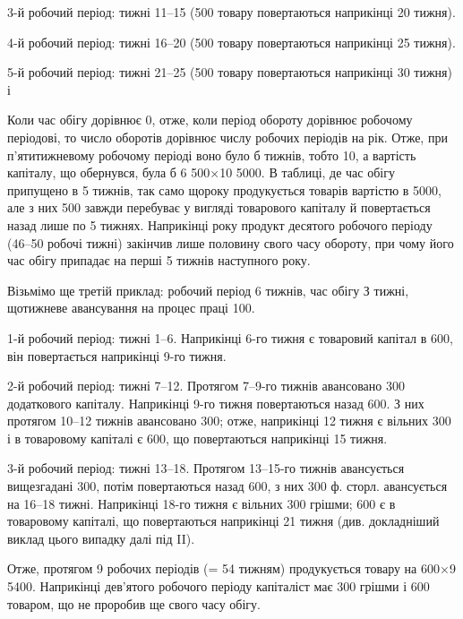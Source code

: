 
3-й робочий період: тижні 11--15 (500 товару повертаються
наприкінці 20 тижня).

4-й робочий період: тижні 16--20 (500 товару повертаються
наприкінці 25 тижня).

5-й робочий період: тижні 21--25 (500 товару повертаються
наприкінці 30 тижня) і~

Коли час обігу дорівнює 0, отже, коли період обороту дорівнює
робочому періодові, то число оборотів дорівнює числу робочих періодів
на рік.
Отже, при п’ятитижневому робочому періоді воно було б \deq{} 
тижнів, тобто 10, а вартість капіталу, що обернувся, була б 6 \deq{} 500×10 \deq{}
5000.
В таблиці, де час обігу припущено в 5 тижнів, так само щороку
продукується товарів вартістю в 5000, але з них  \deq{} 500 завжди перебуває у вигляді товарового капіталу й повертається
назад лише по 5 тижнях. Наприкінці року продукт десятого робочого
періоду (46--50 робочі тижні) закінчив лише половину свого часу
обороту, при чому його час обігу припадає на перші 5 тижнів наступного року.

Візьмімо ще третій приклад: робочий період 6 тижнів, час обігу
З тижні, щотижневе авансування на процес праці 100.

1-й робочий період: тижні 1--6. Наприкінці 6-го тижня є товаровий
капітал в 600, він повертається наприкінці 9-го тижня.

2-й робочий період: тижні 7--12. Протягом 7--9-го тижнів авансовано
300 додаткового капіталу. Наприкінці 9-го тижня повертаються
назад 600. З них протягом 10--12 тижнів авансовано 300; отже, наприкінці 12 тижня є вільних 300 і в товаровому
капіталі є 600, що повертаються наприкінці 15 тижня.

3-й робочий період: тижні 13--18. Протягом 13--15-го тижнів авансується
вищезгадані 300, потім повертаються назад 600,
з них 300 ф. сторл. авансується на 16--18 тижні. Наприкінці 18-го тижня
є вільних 300 грішми; 600 є в товаровому капіталі,
що повертаються наприкінці 21 тижня (див. докладніший виклад
цього випадку далі під II).

Отже, протягом 9 робочих періодів (= 54 тижням) продукується товару
на 600×9 \deq{} 5400. Наприкінці дев’ятого робочого періоду
капіталіст має 300 грішми і 600 товаром, що не
проробив ще свого часу обігу.

